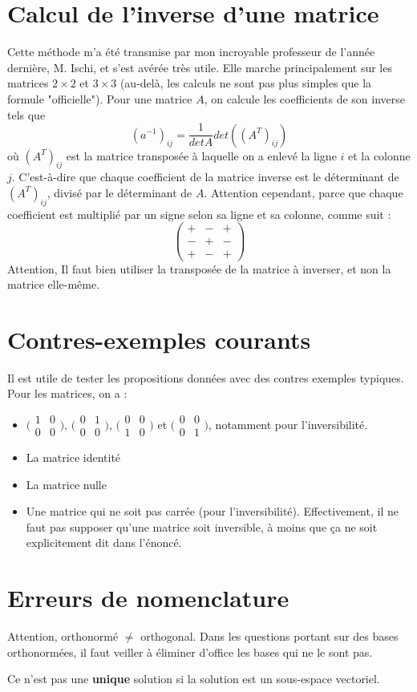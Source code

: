 \documentclass[10pt,a4paper]{book}
\begin{document}
\section{Calcul de l'inverse d'une matrice}
Cette méthode m'a été transmise par mon incroyable professeur de l'année dernière, M. Ischi, et s'est avérée très utile. Elle marche principalement sur les matrices $2\times 2$ et $3\times 3$ (au-delà, les calculs ne sont pas plus simples que la formule "officielle"). Pour une matrice $A$, on calcule les coefficients de son inverse tels que 
\[(a^{-1})_{ij} = \dfrac{1}{detA} det((A^T)_{ij})\]
où $(A^T)_{ij}$ est la matrice transposée à laquelle on a enlevé la ligne $i$ et la colonne $j$. C'est-à-dire que chaque coefficient de la matrice inverse est le déterminant de $(A^T)_{ij}$, divisé par le déterminant de $A$. Attention cependant, parce que chaque coefficient est multiplié par un signe selon sa ligne et sa colonne, comme suit :
\[\begin{pmatrix}
 + & - & +\\
 - & + & -\\
 + & - & +
\end{pmatrix}\]
Attention, Il faut bien utiliser la transposée de la matrice à inverser, et non la matrice elle-même.

\section{Contres-exemples courants}
Il est utile de tester les propositions données avec des contres exemples typiques. Pour les matrices, on a :
\begin{itemize}
\item $\big(\begin{smallmatrix} 
1 & 0\\
0 & 0
\end{smallmatrix}\big)$, 
$\big(\begin{smallmatrix} 
0 & 1\\
0 & 0
\end{smallmatrix}\big)$, 
$\big(\begin{smallmatrix} 
0 & 0\\
1 & 0
\end{smallmatrix}\big)$ et  
$\big(\begin{smallmatrix} 
0 & 0\\
0 & 1
\end{smallmatrix}\big)$, notamment pour l'inversibilité.
\item La matrice identité
\item La matrice nulle
\item Une matrice qui ne soit pas carrée (pour l'inversibilité). Effectivement, il ne faut pas supposer qu'une matrice soit inversible, à moins que ça ne soit explicitement dit dans l'énoncé.
\end{itemize}

\section{Erreurs de nomenclature}
Attention, orthonormé $\neq$ orthogonal. Dans les questions portant sur des bases orthonormées, il faut veiller à éliminer d'office les bases qui ne le sont pas.\par 
Ce n'est pas une \textbf{unique} solution si la solution est un sous-espace vectoriel.
\end{document}
